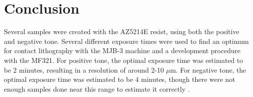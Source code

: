 \newpage
\section*{Conclusion}
Several samples were created with the AZ5214E resist, using both the positive and negative tone. Several different exposure times were used to find an optimum for contact lithography with the MJB-3 machine and a development procedure with the MF321. For positive tone, the optimal exposure time was estimated to be 2 minutes, resulting in a resolution of around 2-10 $\mu$m. For negative tone, the optimal exposure time was estimated to be 4 minutes, though there were not enough samples done near this range to estimate it correctly .